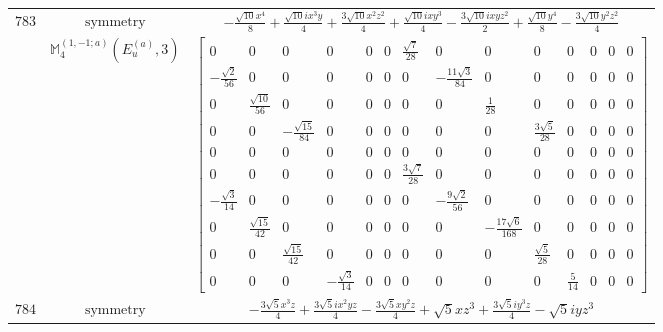\documentclass[fleqn,8pt,landscape]{jsarticle}
\begin{document}
\begin{longtable}{ccc}
$ 783 $ & $ \text{symmetry} $ & $ - \frac{\sqrt{10} x^{4}}{8} + \frac{\sqrt{10} i x^{3} y}{4} + \frac{3 \sqrt{10} x^{2} z^{2}}{4} + \frac{\sqrt{10} i x y^{3}}{4} - \frac{3 \sqrt{10} i x y z^{2}}{2} + \frac{\sqrt{10} y^{4}}{8} - \frac{3 \sqrt{10} y^{2} z^{2}}{4} $ \\
$  $ & $ \mathbb{M}_{4}^{(1,-1;a)}(E_{u}^{(a)},3) $ & $ \begin{bmatrix} 0 & 0 & 0 & 0 & 0 & 0 & \frac{\sqrt{7}}{28} & 0 & 0 & 0 & 0 & 0 & 0 & 0 \\ - \frac{\sqrt{2}}{56} & 0 & 0 & 0 & 0 & 0 & 0 & - \frac{11 \sqrt{3}}{84} & 0 & 0 & 0 & 0 & 0 & 0 \\ 0 & \frac{\sqrt{10}}{56} & 0 & 0 & 0 & 0 & 0 & 0 & \frac{1}{28} & 0 & 0 & 0 & 0 & 0 \\ 0 & 0 & - \frac{\sqrt{15}}{84} & 0 & 0 & 0 & 0 & 0 & 0 & \frac{3 \sqrt{5}}{28} & 0 & 0 & 0 & 0 \\ 0 & 0 & 0 & 0 & 0 & 0 & 0 & 0 & 0 & 0 & 0 & 0 & 0 & 0 \\ 0 & 0 & 0 & 0 & 0 & 0 & \frac{3 \sqrt{7}}{28} & 0 & 0 & 0 & 0 & 0 & 0 & 0 \\ - \frac{\sqrt{3}}{14} & 0 & 0 & 0 & 0 & 0 & 0 & - \frac{9 \sqrt{2}}{56} & 0 & 0 & 0 & 0 & 0 & 0 \\ 0 & \frac{\sqrt{15}}{42} & 0 & 0 & 0 & 0 & 0 & 0 & - \frac{17 \sqrt{6}}{168} & 0 & 0 & 0 & 0 & 0 \\ 0 & 0 & \frac{\sqrt{15}}{42} & 0 & 0 & 0 & 0 & 0 & 0 & \frac{\sqrt{5}}{28} & 0 & 0 & 0 & 0 \\ 0 & 0 & 0 & - \frac{\sqrt{3}}{14} & 0 & 0 & 0 & 0 & 0 & 0 & \frac{5}{14} & 0 & 0 & 0 \end{bmatrix} $ \\ \hline
$ 784 $ & $ \text{symmetry} $ & $ - \frac{3 \sqrt{5} x^{3} z}{4} + \frac{3 \sqrt{5} i x^{2} y z}{4} - \frac{3 \sqrt{5} x y^{2} z}{4} + \sqrt{5} x z^{3} + \frac{3 \sqrt{5} i y^{3} z}{4} - \sqrt{5} i y z^{3} $ \\

\end{longtable}
\end{document}
